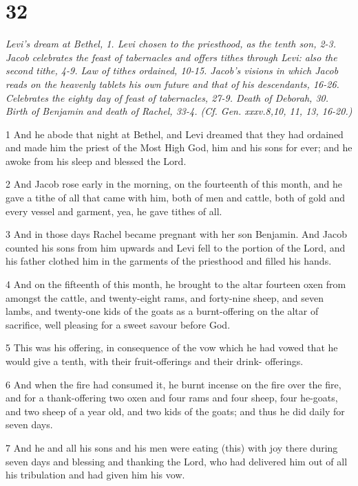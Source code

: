 \chapter{32}

\par \textit{Levi's dream at Bethel, 1. Levi chosen to the priesthood, as the tenth son, 2-3. Jacob celebrates the feast of tabernacles and offers tithes through Levi: also the second tithe, 4-9. Law of tithes ordained, 10-15. Jacob's visions in which Jacob reads on the heavenly tablets his own future and that of his descendants, 16-26. Celebrates the eighty day of feast of tabernacles, 27-9. Death of Deborah, 30. Birth of Benjamin and death of Rachel, 33-4. (Cf. Gen. xxxv.8,10, 11, 13, 16-20.)}

\par 1 And he abode that night at Bethel, and Levi dreamed that they had ordained and made him the priest of the Most High God, him and his sons for ever; and he awoke from his sleep and blessed the Lord.
\par 2 And Jacob rose early in the morning, on the fourteenth of this month, and he gave a tithe of all that came with him, both of men and cattle, both of gold and every vessel and garment, yea, he gave tithes of all.
\par 3 And in those days Rachel became pregnant with her son Benjamin. And Jacob counted his sons from him upwards and Levi fell to the portion of the Lord, and his father clothed him in the garments of the priesthood and filled his hands.
\par 4 And on the fifteenth of this month, he brought to the altar fourteen oxen from amongst the cattle, and twenty-eight rams, and forty-nine sheep, and seven lambs, and twenty-one kids of the goats as a burnt-offering on the altar of sacrifice, well pleasing for a sweet savour before God.
\par 5 This was his offering, in consequence of the vow which he had vowed that he would give a tenth, with their fruit-offerings and their drink- offerings.
\par 6 And when the fire had consumed it, he burnt incense on the fire over the fire, and for a thank-offering two oxen and four rams and four sheep, four he-goats, and two sheep of a year old, and two kids of the goats; and thus he did daily for seven days.
\par 7 And he and all his sons and his men were eating (this) with joy there during seven days and blessing and thanking the Lord, who had delivered him out of all his tribulation and had given him his vow.
